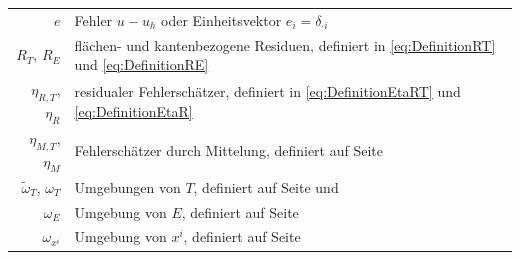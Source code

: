 \documentclass{scrartcl}
\newcommand{\tiomega}{\tilde{\omega}}
\begin{document}
\begin{tabular}{rl}
	$e$ & Fehler $u-u_h$ oder Einheitsvektor $e_i=\delta_{\cdot i}$ \\
	$R_T$, $R_E$ & flächen- und kantenbezogene Residuen, definiert in \eqref{eq:DefinitionRT} und \eqref{eq:DefinitionRE} \\
	$\eta_{R,T}$, $\eta_R$ & residualer Fehlerschätzer, definiert in \eqref{eq:DefinitionEtaRT} und \eqref{eq:DefinitionEtaR} \\
	$\eta_{M,T}$, $\eta_M$ & Fehlerschätzer durch Mittelung, definiert auf Seite \pageref{ch:DefinitionEtaM} \\
	$\tiomega_T$, $\omega_T$ & Umgebungen von $T$, definiert auf Seite \pageref{ch:DefinitionOmegaTildeT} und \pageref{ch:DefinitionOmegaT} \\
	$\omega_E$ & Umgebung von $E$, definiert auf Seite \pageref{ch:DefinitionOmegaT} \\
	$\omega_{x^i}$ & Umgebung von $x^i$, definiert auf Seite \pageref{ch:DefinitionEtaM} \\
\end{tabular}

\nocite{*}


\end{document}
